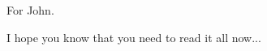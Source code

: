 \vspace{\fill}
\begin{center}
For John.\par
\bigskip
I hope you know that you need to read it all now...
\end{center}
\vspace{\fill}